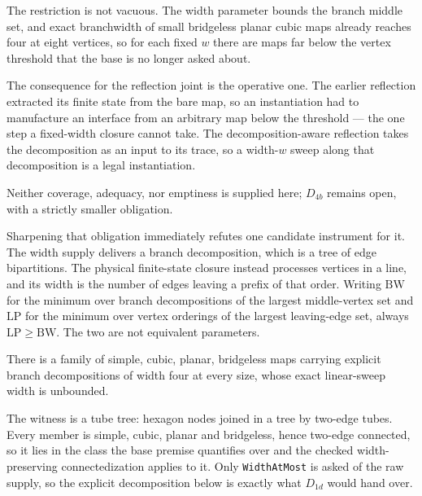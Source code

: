 The restriction is not vacuous.  The width parameter bounds the branch middle
set, and exact branchwidth of small bridgeless planar cubic maps already
reaches four at eight vertices, so for each fixed $w$ there are maps far below
the vertex threshold that the base is no longer asked about.

The consequence for the reflection joint is the operative one.  The earlier
reflection extracted its finite state from the bare map, so an instantiation
had to manufacture an interface from an arbitrary map below the threshold —
the one step a fixed-width closure cannot take.  The decomposition-aware
reflection takes the decomposition as an input to its trace, so a width-$w$
sweep along that decomposition is a legal instantiation.

Neither coverage, adequacy, nor emptiness is supplied here; $D_{4b}$ remains
open, with a strictly smaller obligation.

Sharpening that obligation immediately refutes one candidate instrument for
it.  The width supply delivers a branch decomposition, which is a tree of edge
bipartitions.  The physical finite-state closure instead processes vertices in
a line, and its width is the number of edges leaving a prefix of that order.
Writing $\mathrm{BW}$ for the minimum over branch decompositions of the
largest middle-vertex set and $\mathrm{LP}$ for the minimum over vertex
orderings of the largest leaving-edge set, always $\mathrm{LP}\ge\mathrm{BW}$.
The two are not equivalent parameters.

\begin{proposition}
\label{prop:tree-vs-linear-width-refuted}
There is a family of simple, cubic, planar, bridgeless maps carrying explicit
branch decompositions of width four at every size, whose exact linear-sweep
width is unbounded.
\end{proposition}

The witness is a tube tree: hexagon nodes joined in a tree by two-edge tubes.
Every member is simple, cubic, planar and bridgeless, hence two-edge
connected, so it lies in the class the base premise quantifies over and the
checked width-preserving connectedization applies to it.  Only
\texttt{WidthAtMost} is asked of the raw supply, so the explicit decomposition
below is exactly what $D_{1d}$ would hand over.

